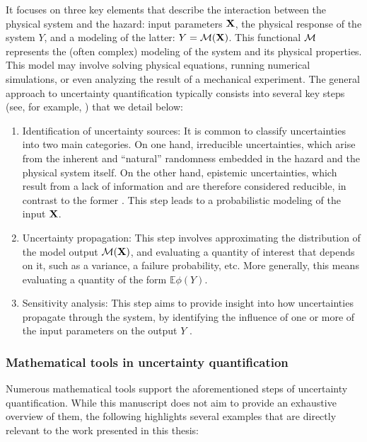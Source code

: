 It focuses on three key elements that describe the interaction between the physical system and the hazard: input parameters $\mathbf{X}$, the physical response of the system $Y$, and a modeling of the latter: $Y = \mathcal{M}(\mathbf{X})$.
This functional $\mathcal{M}$ represents the (often complex) modeling of the system and its physical properties. This model may involve solving physical equations, running numerical simulations, or even analyzing the result of a mechanical experiment.
The general approach to uncertainty quantification typically consists into several key steps (see, for example, 
\cite{sudret_uncertainty_2007,iooss_contributions_2009}) that we detail below:
\begin{enumerate}
    \item Identification of uncertainty sources:
    It is common to classify uncertainties into two main categories. On one hand, irreducible uncertainties, which arise from the inherent and ``natural'' randomness embedded in the hazard and the physical system itself. On the other hand, epistemic uncertainties, which result from a lack of information and are therefore considered reducible, in contrast to the former \citep{hullermeier_aleatoric_2019}. This step leads to a probabilistic modeling of the input $\mathbf{X}$.
    \item Uncertainty propagation: This step involves approximating the distribution of the model output $\mathcal{M}(\mathbf{X})$, and evaluating a quantity of interest that depends on it, such as a variance, a failure probability, etc. More generally, this means evaluating a quantity of the form $\mathbb{E}\phi(Y)$.
    \item Sensitivity analysis: This step aims to provide insight into how uncertainties propagate through the system, by identifying the influence of one or more of the input parameters on the output $Y$ \citep{iooss_review_2015}.
\end{enumerate}

\subsubsection{Mathematical tools in uncertainty quantification}

Numerous mathematical tools support the aforementioned steps of uncertainty quantification. While this manuscript does not aim to provide an exhaustive overview of them, the following highlights several examples that are directly relevant to the work presented in this thesis:

